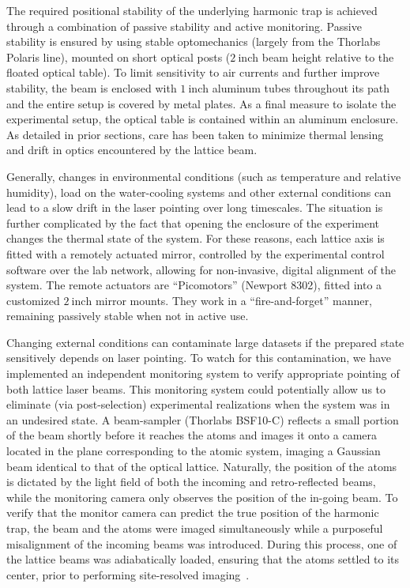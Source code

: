 \documentclass[twocolumn,aps,pra,showpacs,preprintnumbers,bibnotes]{revtex4-1}
\newcommand\unit[2]{\ensuremath{#1~\mathrm{{#2}}}}
\begin{document}
The required positional stability of the underlying harmonic trap is achieved through a combination of passive stability and active monitoring.
Passive stability is ensured by using stable optomechanics (largely from the Thorlabs Polaris line), mounted on short optical posts (\unit{2}{inch} beam height relative to the floated optical table).
To limit sensitivity to air currents and further improve stability, the beam is enclosed with \unit{1}{inch} aluminum tubes throughout its path and the entire setup is covered by metal plates.
As a final measure to isolate the experimental setup, the optical table is contained within an aluminum enclosure. As detailed in prior sections, care has been taken to minimize thermal lensing and drift in optics encountered by the lattice beam.

Generally, changes in environmental conditions (such as temperature and relative humidity), load on the water-cooling systems and other external conditions can lead to a slow drift in the laser pointing over long timescales.
The situation is further complicated by the fact that opening the enclosure of the experiment changes the thermal state of the system.
For these reasons, each lattice axis is fitted with a remotely actuated mirror, controlled by the experimental control software over the lab network, allowing for non-invasive, digital alignment of the system.
The remote actuators are ``Picomotors'' (Newport 8302), fitted into a customized \unit{2}{inch} mirror mounts.
They work in a ``fire-and-forget'' manner, remaining passively stable when not in active use.

Changing external conditions can contaminate large datasets if the prepared state sensitively depends on laser pointing.
To watch for this contamination, we have implemented an independent monitoring system to verify appropriate pointing of both lattice laser beams.
This monitoring system could potentially allow us to eliminate (via post-selection) experimental realizations when the system was in an undesired state.
A beam-sampler (Thorlabs BSF10-C) reflects a small portion of the beam shortly before it reaches the atoms and images it onto a camera located in the plane corresponding to the atomic system, imaging a Gaussian beam identical to that of the optical lattice.
Naturally, the position of the atoms is dictated by the light field of both the incoming and retro-reflected beams, while the monitoring camera only observes the position of the in-going beam.
To verify that the monitor camera can predict the true position of the harmonic trap, the beam and the atoms were imaged simultaneously while a purposeful misalignment of the incoming beams was introduced.
During this process, one of the lattice beams was adiabatically loaded, ensuring that the atoms settled to its center, prior to performing site-resolved imaging~\cite{Parsons2015}.
\end{document}
